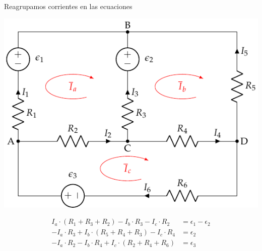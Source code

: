 \documentclass[xcolor={usenames,svgnames,dvipsnames}]{beamer}
\begin{document}
\begin{frame}[label={sec:org8fc0f7b}]{Reagrupamos corrientes en las ecuaciones}
\begin{center}
\includegraphics[height=0.5\textheight]{figs/mallas1_corrientes.pdf}
\end{center}

\begin{align*}
  I_a \cdot (R_1 + R_3 + R_2)  - I_b\cdot R_3 - I_c \cdot R_2 &= \epsilon_1 - \epsilon_2\\
  - I_a \cdot R_3 + I_b \cdot (R_5 + R_4 + R_3) - I_c \cdot R_4 &=  \epsilon_2\\
  - I_a \cdot R_2 - I_b \cdot R_4 + I_c \cdot (R_2 + R_4 + R_6) &= \epsilon_3
\end{align*}
\end{frame}
\end{document}
